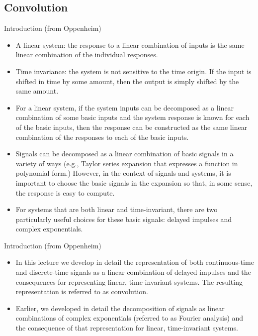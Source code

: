 \subsection{Convolution}

\begin{frame}{Introduction (from Oppenheim)}
    \begin{itemize}
        \item A linear system: the response to a linear combination of inputs is the same linear combination of the individual responses.
        \item Time invariance: the system is not sensitive to the time origin. If the input is shifted in time by some amount, then the output is simply shifted by the same amount.
        \item For a linear system, if the system inputs can be decomposed as a linear combination of some basic inputs and the system response is known for each of the basic inputs, then the response can be constructed as the same linear combination of the responses to each of the basic inputs.
        \item Signals can be decomposed as a linear combination of basic signals in a variety of ways (e.g., Taylor series expansion that expresses a function in polynomial form.) However, in the context of signals and systems, it is important to choose the basic signals in the expansion so that, in some sense, the response is easy to compute.
        \item For systems that are both linear and time-invariant, there are two particularly useful choices for these basic signals: \alert{delayed impulses} and \alert{complex exponentials}.
    \end{itemize}
\end{frame}

\begin{frame}{Introduction (from Oppenheim)}
    \begin{itemize}
        \item In this lecture we develop in detail the representation of both continuous-time and discrete-time signals as a linear combination of delayed impulses and the consequences for representing linear, time-invariant systems. The resulting representation is referred to as \alert{convolution}.
        \item Earlier, we developed in detail the decomposition of signals as linear combinations of complex exponentials (referred to as Fourier analysis) and the consequence of that representation for linear, time-invariant systems.
    \end{itemize}
\end{frame}

